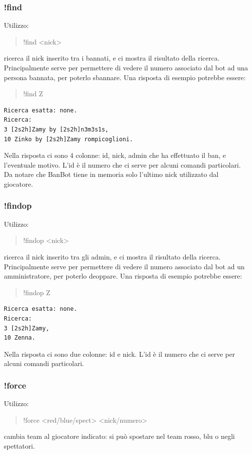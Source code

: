 \documentclass[a4paper]{article}
\begin{document}
\subsubsection{!find}
Utilizzo:
\begin{quote}
!find \textless{}nick\textgreater{}
\end{quote}
ricerca il nick inserito tra i bannati, e ci mostra il risultato della ricerca.\\
Principalmente serve per permettere di vedere il numero associato dal bot ad una persona bannata, per poterlo sbannare.
Una risposta di esempio potrebbe essere:
\begin{quote}
!find Z
\end{quote}
\begin{lstlisting}
Ricerca esatta: none.
Ricerca:
3 [2s2h]Zamy by [2s2h]n3m3s1s,
10 Zinko by [2s2h]Zamy rompicoglioni.
\end{lstlisting}
Nella risposta ci sono 4 colonne: id, nick, admin che ha effettuato il ban, e l'eventuale motivo.
L'id \`e il numero che ci serve per alcuni comandi particolari.\\
Da notare che BanBot tiene in memoria solo l'ultimo nick utilizzato dal giocatore.

\subsubsection{!findop}
Utilizzo:
\begin{quote}
!findop \textless{}nick\textgreater{}
\end{quote}
ricerca il nick inserito tra gli admin, e ci mostra il risultato della ricerca.\\
Principalmente serve per permettere di vedere il numero associato dal bot ad un amministratore, per poterlo deoppare.
Una risposta di esempio potrebbe essere:
\begin{quote}
!findop Z
\end{quote}
\begin{lstlisting}
Ricerca esatta: none.
Ricerca:
3 [2s2h]Zamy,
10 Zenna.
\end{lstlisting}
Nella risposta ci sono due colonne: id e nick.
L'id \`e il numero che ci serve per alcuni comandi particolari.

\subsubsection{!force}
Utilizzo:
\begin{quote}
!force \textless{}red/blue/spect\textgreater{} \textless{}nick/numero\textgreater{}
\end{quote}
cambia team al giocatore indicato: si pu\`o spostare nel team rosso, blu o negli spettatori.
\end{document}
